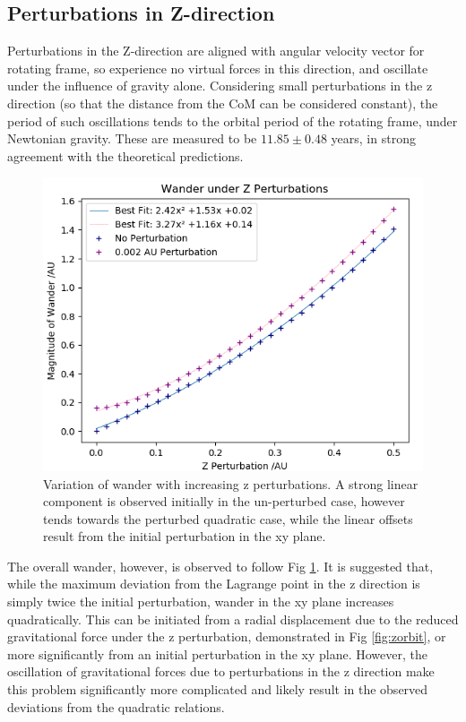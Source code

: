 \documentclass[11pt, a4paper,twocolumn]{article} %
\begin{document}
\subsection{Perturbations in Z-direction} \label{3D}
Perturbations in the Z-direction are aligned with angular velocity vector for rotating frame, so experience no virtual forces in this direction, and oscillate under the influence of gravity alone. Considering small perturbations in the z direction (so that the distance from the CoM can be considered constant), the period of such oscillations tends to the orbital period of the rotating frame, under Newtonian gravity. These are measured to be $11.85 \pm 0.48$ years, in strong agreement with the theoretical predictions.

\begin{figure}
	\centering
	\includegraphics[width=0.8\linewidth]{Figures/z_perturbations5c}
	\caption{Variation of wander with increasing z perturbations. A strong linear component is observed initially in the un-perturbed case, however tends towards the perturbed quadratic case, while the linear offsets result from the initial perturbation in the xy plane.}
	\label{fig:zwander}
\end{figure}

The overall wander, however, is observed to follow Fig \ref{fig:zwander}.
It is suggested that, while the maximum deviation from the Lagrange point in the z direction is simply twice the initial perturbation, wander in the xy plane increases quadratically. This can be initiated from a radial displacement due to the reduced gravitational force  under the z perturbation, demonstrated in Fig \ref{fig:zorbit}, or more significantly from an initial perturbation in the xy plane. However, the oscillation of gravitational forces due to perturbations in the z direction make this problem significantly more complicated and likely result in the observed deviations from the quadratic relations.
\end{document}
